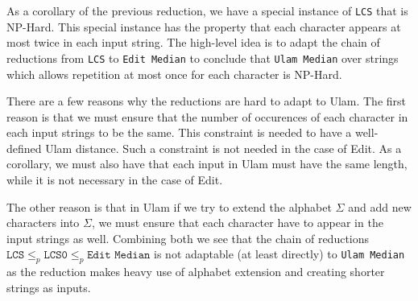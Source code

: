 As a corollary of the previous reduction, we have a special instance of \texttt{LCS} that is NP-Hard. This special instance has the property that each character appears at most twice in each input string. The high-level idea is to adapt the chain of reductions from \texttt{LCS} to \texttt{Edit Median} to conclude that \texttt{Ulam Median} over strings which allows repetition at most once for each character is NP-Hard.

There are a few reasons why the reductions are hard to adapt to Ulam. The first reason is that we must ensure that the number of occurences of each character in each input strings to be the same. This constraint is needed to have a well-defined Ulam distance. Such a constraint is not needed in the case of Edit. As a corollary, we must also have that each input in Ulam must have the same length, while it is not necessary in the case of Edit.

The other reason is that in Ulam if we try to extend the alphabet $\Sigma$ and add new characters into $\Sigma$, we must ensure that each character have to appear in the input strings as well. Combining both we see that the chain of reductions $\texttt{LCS} \leq_p \texttt{LCS0} \leq_p \texttt{Edit Median}$ is not adaptable (at least directly) to \texttt{Ulam Median} as the reduction makes heavy use of alphabet extension and creating shorter strings as inputs.




